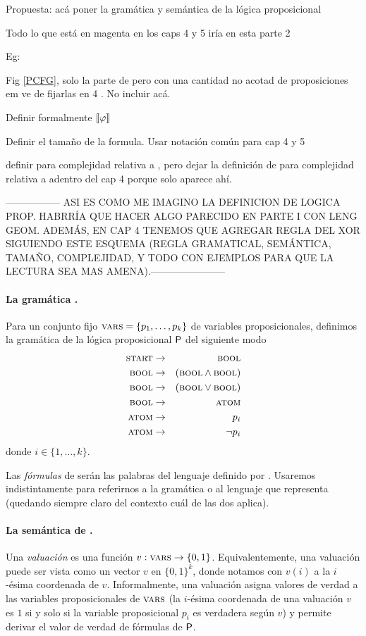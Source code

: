 

    \color{magenta}
    Propuesta: acá poner la gramática y semántica de la lógica proposicional

    Todo lo que está en magenta en los caps 4 y 5 iría en esta parte 2

    Eg:
    
    Fig \ref{PCFG}, solo la parte de \grambool pero con una cantidad no acotad de proposiciones em ve de fijarlas en 4 . No incluir \gramboolxor acá.

    Definir formalmente $\llbracket \varphi\rrbracket$

    Definir el tamaño de la formula. Usar notación común para cap 4 y 5

    definir  \mdlbool para complejidad relativa a \grambool, pero dejar la definición de
      \mdlboolxor para complejidad relativa a \gramboolxor adentro del cap 4 porque solo aparece ahí. 


----------------- ASI ES COMO ME IMAGINO LA DEFINICION DE LOGICA PROP. HABRRÍA QUE HACER ALGO PARECIDO EN PARTE I CON LENG GEOM. ADEMÁS, EN CAP 4 TENEMOS QUE AGREGAR REGLA DEL XOR SIGUIENDO ESTE ESQUEMA (REGLA GRAMATICAL, SEMÁNTICA, TAMAÑO, COMPLEJIDAD, Y TODO CON EJEMPLOS PARA QUE LA LECTURA SEA MAS AMENA).-----------------------

\paragraph{La gramática \grambool.}
Para un conjunto fijo $\textsc{vars}=\{p_1,\dots,p_k\}$ de variables proposicionales, definimos la gramática de la lógica proposicional ${\sf P}$ del siguiente modo
%
\begin{eqnarray*}
\textsc{start} &\to&\textsc{bool}\\
\textsc{bool} &\to&(\textsc{bool} \wedge \textsc{bool}) \\
\textsc{bool} &\to&(\textsc{bool} \vee \textsc{bool}) \\
\textsc{bool} &\to&\textsc{atom}\\
\textsc{atom} &\to& p_i \\
\textsc{atom} &\to&\lnot p_i 
\end{eqnarray*}
donde $i\in\{1,\dots,k\}$.

Las {\em fórmulas} de \grambool serán las palabras del lenguaje definido por \grambool. Usaremos indistintamente \grambool para referirnos a la gramática o al lenguaje que representa (quedando siempre claro del contexto cuál de las dos aplica).


\paragraph{La semántica de \grambool.}
Una {\em valuación} es una función $v:\textsc{vars}\to\{0,1\}$. Equivalentemente, una valuación puede ser vista como un vector $v$ en $\{0,1\}^k$, donde notamos con $v(i)$ a la $i$-ésima coordenada de $v$. Informalmente, una valuación asigna valores de verdad a las variables proposicionales de $\textsc{vars}$ (la $i$-ésima coordenada de una valuación $v$ es $1$ si y solo si la variable proposicional $p_i$ es verdadera según $v$) y permite derivar el valor de verdad de fórmulas de ${\sf P}$.  

